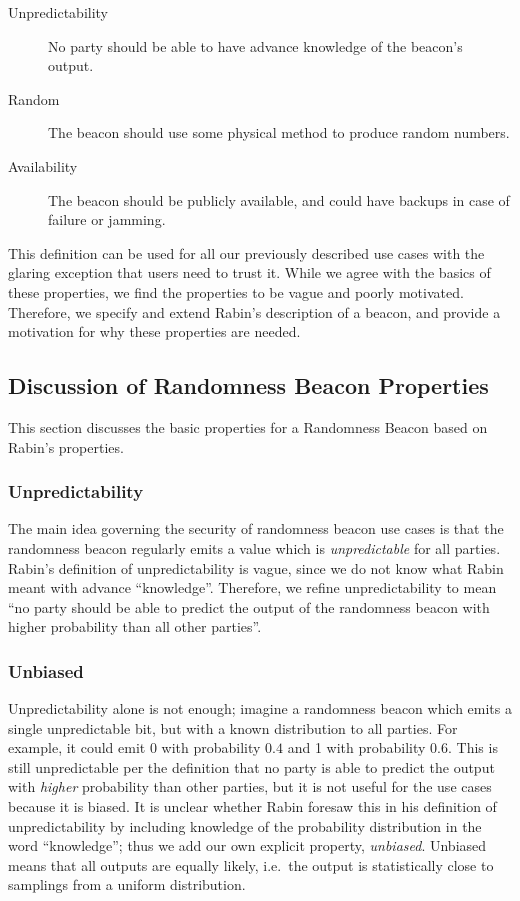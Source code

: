 \begin{description}
    \item[Unpredictability] No party should be able to have advance knowledge of the beacon's output.
    \item[Random] The beacon should use some physical method to produce random numbers.
    \item[Availability] The beacon should be publicly available, and could have backups in case of failure or jamming.
\end{description}

This definition can be used for all our previously described use cases with the glaring exception that users need to trust it.
While we agree with the basics of these properties, we find the properties to be vague and poorly motivated.
Therefore, we specify and extend Rabin's description of a beacon, and provide a motivation for why these properties are needed.

\subsection{Discussion of Randomness Beacon Properties}
This section discusses the basic properties for a Randomness Beacon based on Rabin's properties. 

\subsubsection{Unpredictability}
The main idea governing the security of randomness beacon use cases is that the randomness beacon regularly emits a value which is \emph{unpredictable} for all parties.
Rabin's definition of unpredictability is vague, since we do not know what Rabin meant with advance \enquote{knowledge}.
Therefore, we refine unpredictability to mean \enquote{no party should be able to predict the output of the randomness beacon with higher probability than all other parties}.

\subsubsection{Unbiased}
Unpredictability alone is not enough; imagine a randomness beacon which emits a single unpredictable bit, but with a known distribution to all parties.
For example, it could emit 0 with probability $0.4$ and 1 with probability $0.6$.
This is still unpredictable per the definition that no party is able to predict the output with \emph{higher} probability than other parties, but it is not useful for the use cases because it is biased.
It is unclear whether Rabin foresaw this in his definition of unpredictability by including knowledge of the probability distribution in the word \enquote{knowledge}; thus we add our own explicit property, \emph{unbiased}.
Unbiased means that all outputs are equally likely, i.e.\ the output is statistically close to samplings from a uniform distribution.

